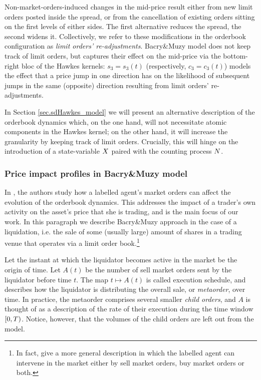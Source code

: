\documentclass[10pt, article,table]{article}
\begin{document}
Non-market-orders-induced changes in the mid-price result either from new limit orders posted inside the spread, or from the cancellation of existing orders sitting on the first levels of either sides. The first alternative reduces the spread, the second widens it. Collectively, we refer to these modifications in the orderbook configuration as \emph{limit orders' re-adjustments}.   Bacry\&Muzy model does not keep track of limit orders, but captures their effect on the mid-price via the bottom-right bloc of the Hawkes kernels: $s_3=s_3(t)$ (respectively, $c_3=c_3(t)$)  models the effect that a price jump in one direction has on the likelihood of subsequent jumps in the same (opposite) direction resulting from limit orders' re-adjustments.

In Section \ref{sec.sdHawkes_model} we will present an alternative description of the orderbook dynamics which, on the one hand, will not necessitate atomic components in the Hawkes kernel; on the other hand, it will increase the granularity by keeping track of limit orders. Crucially, this will hinge on the introduction of a state-variable $X$ paired with the  counting process $N$. 

\subsubsection{Price impact profiles in Bacry\&Muzy model}\label{sec.BM14_price_impact_profiles}
In \citealp[Section 4]{BM14haw}, the authors study how a labelled agent's market orders can affect the evolution of the orderbook dynamics. This addresses the impact of a trader's own activity on the asset's price that she is trading, and is the main focus of our work. In this paragraph we describe Bacry\&Muzy approach in the case of a liquidation, i.e. the sale of some (usually large) amount of shares in a trading venue that operates via a limit order book.\footnote{In fact, \citealp{BM14haw} give a more general description in which the labelled agent can intervene in the market either by sell market orders, buy market orders or both.}

Let the instant at which the liquidator becomes active in the market be the origin of time. Let $A(t)$ be the number of sell market orders sent by the liquidator before time  $t$. The map $t\mapsto A(t)$ is called execution schedule, and describes how the liquidator is distributing the overall sale, or  \emph{metaorder}, over time.  In practice, the metaorder comprises several smaller \emph{child orders}, and $A$ is thought of as a description of the rate of their execution during the time window $[0,T)$. Notice, however, that the volumes of the child orders are left out from the model. 
\end{document}
